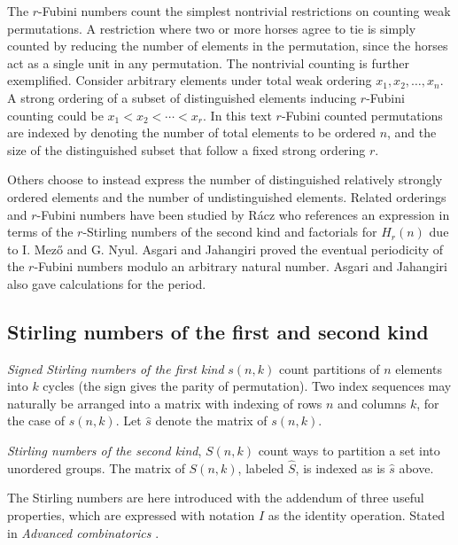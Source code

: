 \documentclass[12pt,reqno]{article}
\begin{document}
The $r$-Fubini numbers count the simplest nontrivial restrictions on counting weak permutations. A restriction where two  or more horses agree to tie is simply counted by reducing the number of elements in the permutation, since the horses act as a single unit in any permutation. The nontrivial counting is further exemplified. Consider arbitrary elements under total weak ordering $x_{1}, x_{2}, \ldots, x_{n}$. A strong ordering of a subset of distinguished elements inducing $r$-Fubini counting could be $x_{1} < x_{2} < \cdots < x_{r}$. In this text $r$-Fubini counted permutations are indexed by denoting the number of total elements to be ordered $n$, and the size of the distinguished subset  that follow a fixed strong ordering $r$.

Others choose to instead express the number of distinguished relatively strongly ordered elements and the number of undistinguished elements. Related orderings and $r$-Fubini numbers have been studied by R\'acz  \cite{cc:racz} who references an expression in terms of the $r$-Stirling numbers of the second kind and factorials for $H_{r}(n)$ due to I. Mez\H{o} and G. Nyul. Asgari and Jahangiri \cite{cc:asgari} proved the eventual periodicity of the $r$-Fubini numbers modulo an arbitrary natural number. Asgari and Jahangiri also gave calculations for the period.

\subsection{Stirling numbers of the first and second kind}\label{sec:stirling}

\begin{definition}
	{\em Signed Stirling numbers of the first kind} $s(n,k)$ count partitions of $n$ elements into $k$ cycles (the sign gives the parity of permutation). Two index sequences may naturally be arranged into a matrix with indexing of rows $n$ and columns $k$, for the case of $s(n,k)$. Let $\hat{s}$ denote the matrix of $s(n,k)$.
\end{definition}

\begin{definition}
	{\em Stirling numbers of the second kind}, $S(n,k)$ count ways to partition a set into unordered groups. The matrix of $S(n,k)$, labeled $\hat{S}$, is indexed as is $\hat{s}$ above.
\end{definition}

The Stirling numbers are here introduced with the addendum of three useful properties, which are expressed with notation $I$ as the identity operation. Stated in \textit{Advanced combinatorics} \cite{cc:matrix}.
\end{document}
